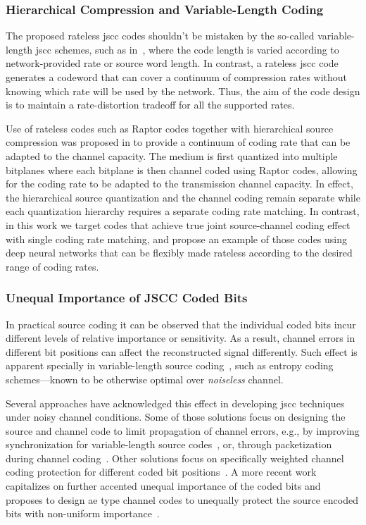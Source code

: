 \subsubsection{Hierarchical Compression and Variable-Length Coding}

The proposed rateless \gls{jscc} codes shouldn't be mistaken by the so-called variable-length \gls{jscc} schemes, such as in~\cite{10198383,8445924}, where the code length is varied according to network-provided rate or source word length. In contrast, a rateless \gls{jscc} code generates a codeword that can cover a continuum of compression rates  without knowing which rate will be used by the network. Thus, the aim of the code design is to maintain a rate-distortion tradeoff for all  the supported rates. 

Use of rateless codes such as Raptor codes together with hierarchical source compression was proposed in \cite{bursalioglu2008lossy,bursalioglu2013joint} to provide a continuum of coding rate that can be adapted to the channel capacity. The medium is first  quantized into multiple bitplanes where each bitplane is then channel coded using Raptor codes, allowing for the coding rate to be adapted to the transmission channel capacity. In effect, the hierarchical source quantization and the channel coding remain separate while each quantization  hierarchy requires a separate coding rate matching. In contrast, in this work we target codes that achieve  true joint source-channel coding effect with single coding rate matching, and propose an example of those codes using deep neural networks that can be flexibly made rateless according to the desired range of coding rates.


\subsubsection{Unequal Importance of JSCC Coded Bits}

In practical source coding  it can be observed that  the individual coded bits incur different levels of relative importance or sensitivity. As a result, channel errors in different bit positions can affect the reconstructed signal differently. Such effect is apparent specially in variable-length source coding~\cite{748887}, such as entropy coding schemes---known to be otherwise optimal over \emph{noiseless} channel.

Several approaches have acknowledged this effect in developing \gls{jscc} techniques  under noisy channel conditions. Some of those solutions focus on designing the source and channel code to limit propagation of channel errors, e.g., by improving  synchronization for variable-length source codes~\cite{selfsyncvariablejscc}, or, through packetization during channel coding~\cite{138998}. Other solutions focus on  specifically weighted channel coding protection for different coded bit positions~\cite{1095155,748707}. A more recent work capitalizes on further accented unequal importance of the coded bits and proposes to design \gls{ae} type channel codes to unequally protect the source encoded bits with non-uniform importance~\cite{tung2024multilevelreliabilityinterfacesemantic}. 

